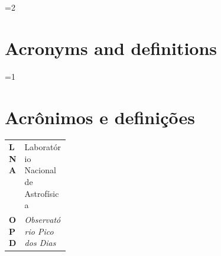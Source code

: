 \ifnum\value{linguagemdocumento}=2
    \section*{Acronyms and definitions}
\else \ifnum\value{linguagemdocumento}=1
        \section*{Acrônimos e definições}
    \fi \fi

\noindent
{\renewcommand{\arraystretch}{1.25}%
    \begin{tabularx}{0.96\linewidth}{@{}>{\raggedright\arraybackslash}p{0.12\linewidth} >{\raggedright\arraybackslash}X@{}}
        \textbf{LNA} & Laboratório Nacional de Astrofísica \\
        \textbf{OPD} & \textsl{Observatório Pico dos Dias} \\
    \end{tabularx}}
